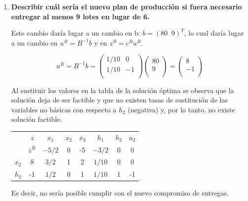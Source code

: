 \begin{enumerate}
    
En cualquiera de los caso, el plan de programación óptimo consiste en:
\begin{itemize}
    \item Producir 8 lotes de sillas.
    \item No producir ni mesas ni estanterías.
    \item Hacer uso al completo de las 80 horas de montaje.
    \item Cumplir el compromiso comercial superando en dos lotes el compromiso mínimo.
\end{itemize}

\item \textbf{Describir cuál sería el nuevo plan de producción si fuera necesario entregar al menos 9 lotes en lugar de 6.}

   
Este cambio daría lugar a un cambio en b: $b=(80 \;\; 9)^T$, lo cual daría lugar a un cambio en $u^B=B^{-1}b$ y en $z^B=c^Bu^B$.

\begin{equation}
    u^B=B^{-1}b =
    \begin{pmatrix}
    1/10 & 0\\
    1/10 & -1\\
    \end{pmatrix}
    \begin{pmatrix}
    80\\
    9\\
    \end{pmatrix} = 
    \begin{pmatrix}
    8\\
    -1\\
    \end{pmatrix} 
\end{equation}

Al sustituir los valores en la tabla de la solución óptima se observa que la solución deja de ser factible y que no existen tasas de sustitución de las variables no básicas con respecto a $h_2$ (negativa) y, por lo tanto, no existe solución factible. 

    \begin{center}
    \begin{tabular}{c|c|cccccc|}
     & $z$ & $x_1$ & $x_2$ & $x_3$ & $h_1$ & $h_2$ & $a_2$\\ 
      & $z^B$ & $-5/2$ & 0 & -5 & $-3/2$ & 0 & 0 \\ 
    \hline
    $x_2$ & 8  & $3/2$ & 1 & 2 & $1/10$ & 0 & 0\\ 
    $h_2$ & -1 & $1/2$ & 0 & 1 & $1/10$ & 1 & -1\\ 
    \hline
    \end{tabular}
    \end{center}
Es decir, no sería posible cumplir con el nuevo compromiso de entregas.


\end{enumerate}
